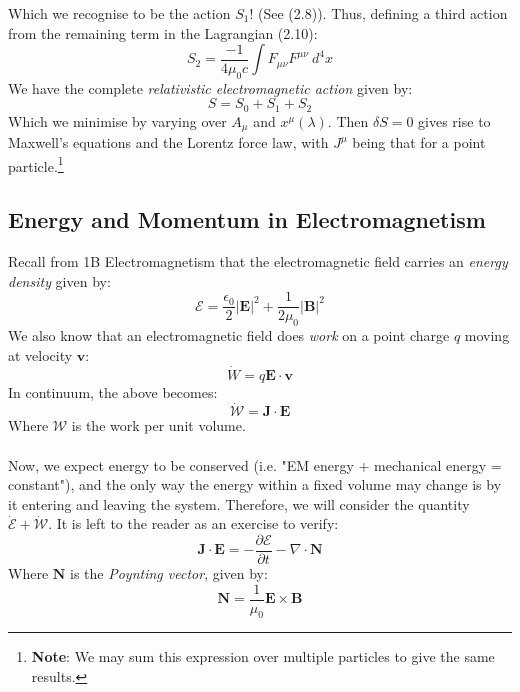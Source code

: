 \documentclass[a4paper]{article}
\numberwithin{equation}{section}
\begin{document}
Which we recognise to be the action $S_1$! (See (2.8)). Thus, defining a third action from the remaining term in the Lagrangian (2.10):
\begin{equation}
S_2=\frac{-1}{4\mu_0 c}\int F_{\mu \nu}F^{\mu \nu} \ d^4x
\end{equation}
We have the complete \textit{relativistic electromagnetic action} given by:
\begin{equation}
S=S_0+S_1+S_2
\end{equation}
Which we minimise by varying over $A_\mu$ and $x^\mu(\lambda)$. Then $\delta S=0$ gives rise to Maxwell's equations and the Lorentz force law, with $J^\mu$ being that for a point particle.\footnote{\textbf{Note}: We may sum this expression over multiple particles to give the same results.}
\subsection{Energy and Momentum in Electromagnetism}
Recall from 1B Electromagnetism that the electromagnetic field carries an \textit{energy density} given by:
\begin{equation}
\mathcal{E} = \frac{\epsilon_0}{2}|\mathbf{E}|^2+\frac{1}{2\mu_0}|\mathbf{B}|^2
\end{equation}
We also know that an electromagnetic field does \textit{work} on a point charge $q$ moving at velocity $\mathbf{v}$:
\begin{equation}
\dot{W}=q\mathbf{E}\cdot \mathbf{v}
\end{equation}
In continuum, the above becomes:
\begin{equation}
\dot{\mathcal{W}}=\mathbf{J}\cdot \mathbf{E}
\end{equation}
Where $\mathcal{W}$ is the work per unit volume.\\
\\
Now, we expect energy to be conserved (i.e. "EM energy + mechanical energy = constant"), and the only way the energy within a fixed volume may change is by it entering and leaving the system. Therefore, we will consider the quantity $\dot{\mathcal{E}}+\dot{\mathcal{W}}$. It is left to the reader as an exercise to verify:
\begin{equation}
\mathbf{J}\cdot \mathbf{E}= -\frac{\partial \mathcal{E}}{\partial t}- \nabla \cdot \mathbf{N}
\end{equation}
Where $\mathbf{N}$ is the \textit{Poynting vector}, given by:
\begin{equation}
\mathbf{N}=\frac{1}{\mu_0}\mathbf{E} \times \mathbf{B}
\end{equation}
\end{document}
